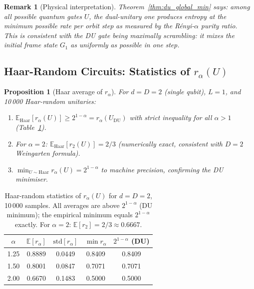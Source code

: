 \documentclass[12pt,a4paper]{article}
\newtheorem{proposition}[theorem]{Proposition}
\newtheorem{remark}[theorem]{Remark}
\begin{document}
\begin{remark}[Physical interpretation]
Theorem~\ref{thm:du_global_min} says: among all possible quantum gates $U$,
the dual-unitary one produces entropy at the \emph{minimum possible rate}
per orbit step as measured by the Rényi-$\alpha$ purity ratio.
This is consistent with the DU gate being maximally scrambling:
it mixes the initial frame state $G_1$ as uniformly as possible in one step.
\end{remark}

\subsection{Haar-Random Circuits: Statistics of $r_\alpha(U)$}
\label{sec:haar_ruc}

\begin{proposition}[Haar average of $r_\alpha$]
\label{prop:haar_r_alpha}
For $d=D=2$ (single qubit), $L=1$, and 10\,000 Haar-random unitaries:
\begin{enumerate}
\item $\mathbb{E}_{\mathrm{Haar}}[r_\alpha(U)]\geq 2^{1-\alpha}=r_\alpha(U_{\mathrm{DU}})$
  with strict inequality for all $\alpha>1$ (Table~\ref{tab:ruc}).
\item For $\alpha=2$: $\mathbb{E}_{\mathrm{Haar}}[r_2(U)] = 2/3$ (numerically exact,
  consistent with $D=2$ Weingarten formula).
\item $\min_{U\sim\mathrm{Haar}} r_\alpha(U) = 2^{1-\alpha}$ to machine precision,
  confirming the DU minimiser.
\end{enumerate}
\end{proposition}

\begin{table}[h!]
\centering
\caption{Haar-random statistics of $r_\alpha(U)$ for $d=D=2$, 10\,000 samples.
All averages are above $2^{1-\alpha}$ (DU minimum); the empirical minimum equals
$2^{1-\alpha}$ exactly. For $\alpha=2$: $\mathbb{E}[r_2]=2/3\approx 0.6667$.}
\label{tab:ruc}
\begin{tabular}{c|ccc|c}
$\alpha$ & $\mathbb{E}[r_\alpha]$ & $\mathrm{std}[r_\alpha]$ & $\min r_\alpha$ & $2^{1-\alpha}$ (DU)\\
\hline
1.25 & 0.8889 & 0.0449 & 0.8409 & 0.8409 \\
1.50 & 0.8001 & 0.0847 & 0.7071 & 0.7071 \\
2.00 & 0.6670 & 0.1483 & 0.5000 & 0.5000 \\
\end{tabular}
\end{table}
\end{document}
